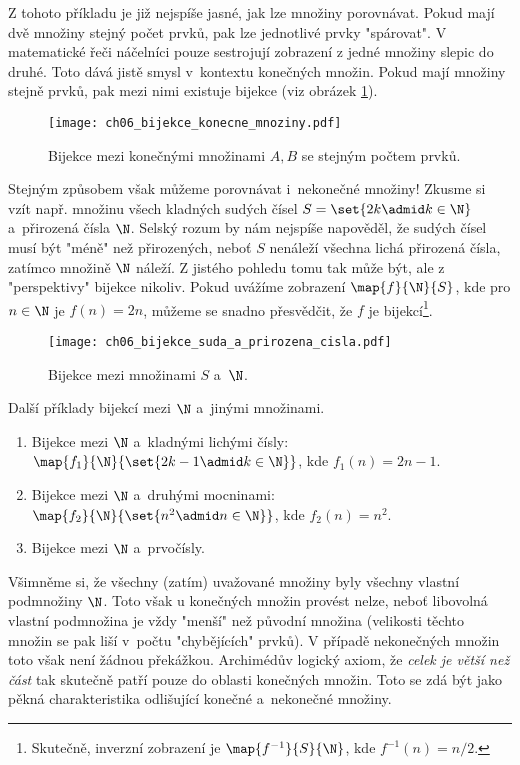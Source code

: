Z tohoto příkladu je již nejspíše jasné, jak lze množiny porovnávat. Pokud mají dvě množiny stejný počet prvků, pak lze jednotlivé prvky "spárovat". V matematické řeči náčelníci pouze sestrojují zobrazení z jedné množiny slepic do druhé. Toto dává jistě smysl v~kontextu konečných množin. Pokud mají množiny stejně prvků, pak mezi nimi existuje bijekce (viz obrázek \ref{fig:bijekce_konecne_mnoziny}).
\begin{figure}[h]
    \centering
    \texttt{[image: ch06\_bijekce\_konecne\_mnoziny.pdf]}
    \caption{Bijekce mezi konečnými množinami $A,B$ se stejným počtem prvků.}
    \label{fig:bijekce_konecne_mnoziny}
\end{figure}
Stejným způsobem však můžeme porovnávat i~nekonečné množiny! Zkusme si vzít např. množinu všech kladných sudých čísel $S=\set{2k\admid k\in\N}$ a~přirozená čísla $\N$. Selský rozum by nám nejspíše napověděl, že sudých čísel musí být "méně" než přirozených, neboť $S$ nenáleží všechna lichá přirozená čísla, zatímco množině $\N$ náleží. Z jistého pohledu tomu tak může být, ale z "perspektivy" bijekce nikoliv. Pokud uvážíme zobrazení $\map{f}{\N}{S}$, kde pro $n\in\N$ je $f(n)=2n$, můžeme se snadno přesvědčit, že $f$ je bijekcí\footnote{Skutečně, inverzní zobrazení je $\map{f^{-1}}{S}{\N}$, kde $f^{-1}(n)=n/2$.}.
\begin{figure}[h]
    \centering
    \texttt{[image: ch06\_bijekce\_suda\_a\_prirozena\_cisla.pdf]}
    \caption{Bijekce mezi množinami $S$ a~$\N$.}
    \label{fig:bijekce_suda_a_prirozena_cisla}
\end{figure}
\begin{example}\label{ex:bijekce_prirozena_cisla}
    Další příklady bijekcí mezi $\N$ a~jinými množinami.
    \begin{enumerate}[label=(\roman*)]
        \item Bijekce mezi $\N$ a~kladnými lichými čísly: $\map{f_1}{\N}{\set{2k-1\admid k\in\N}}$, kde $f_1(n)=2n-1$.
        \item Bijekce mezi $\N$ a~druhými mocninami: $\map{f_2}{\N}{\set{n^2\admid n\in\N}}$, kde $f_2(n)=n^2$.
        \item Bijekce mezi $\N$ a~prvočísly.
    \end{enumerate}
\end{example}
Všimněme si, že všechny (zatím) uvažované množiny byly všechny vlastní podmnožiny $\N$. Toto však u konečných množin provést nelze, neboť libovolná vlastní podmnožina je vždy "menší" než původní množina (velikosti těchto množin se pak liší v~počtu "chybějících" prvků). V případě nekonečných množin toto však není žádnou překážkou. Archimédův logický axiom, že \emph{celek je větší než část} tak skutečně patří pouze do oblasti konečných množin. Toto se zdá být jako pěkná charakteristika odlišující konečné a~nekonečné množiny.\par

